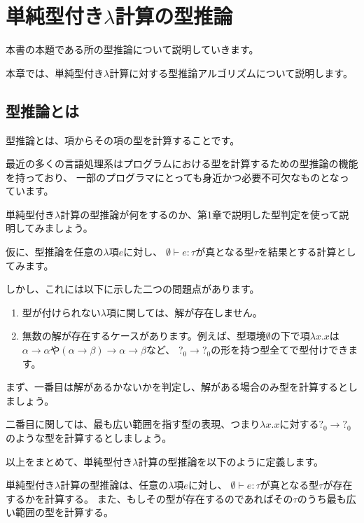 
\chapter{単純型付き$\lambda$計算の型推論}

本書の本題である所の型推論について説明していきます。

本章では、単純型付き$\lambda$計算に対する型推論アルゴリズムについて説明します。

\section{型推論とは}

型推論とは、項からその項の型を計算することです。

最近の多くの言語処理系はプログラムにおける型を計算するための型推論の機能を持っており、
一部のプログラマにとっても身近かつ必要不可欠なものとなっています。

単純型付き$\lambda$計算の型推論が何をするのか、第1章で説明した型判定を使って説明してみましょう。

仮に、型推論を任意の$\lambda$項$e$に対し、
$\emptyset \vdash e : \tau$が真となる型$\tau$を結果とする計算としてみます。

しかし、これには以下に示した二つの問題点があります。

\begin{enumerate}
  \item 型が付けられない$\lambda$項に関しては、解が存在しません。
  \item 無数の解が存在するケースがあります。例えば、型環境$\emptyset$の下で項$\lambda x . x$は
       $\alpha \to \alpha$や$(\alpha \to \beta) \to \alpha \to \beta$など、
       $?_0 \to ?_0$の形を持つ型全てで型付けできます。
\end{enumerate}

まず、一番目は解があるかないかを判定し、解がある場合のみ型を計算するとしましょう。

二番目に関しては、最も広い範囲を指す型の表現、つまり$\lambda x . x$に対する$?_0 \to ?_0$
のような型を計算するとしましょう。

以上をまとめて、単純型付き$\lambda$計算の型推論を以下のように定義します。

\begin{definition}
単純型付き$\lambda$計算の型推論は、任意の$\lambda$項$e$に対し、
$\emptyset \vdash e : \tau$が真となる型$\tau$が存在するかを計算する。
また、もしその型が存在するのであればその$\tau$のうち最も広い範囲の型を計算する。
\end{definition}

